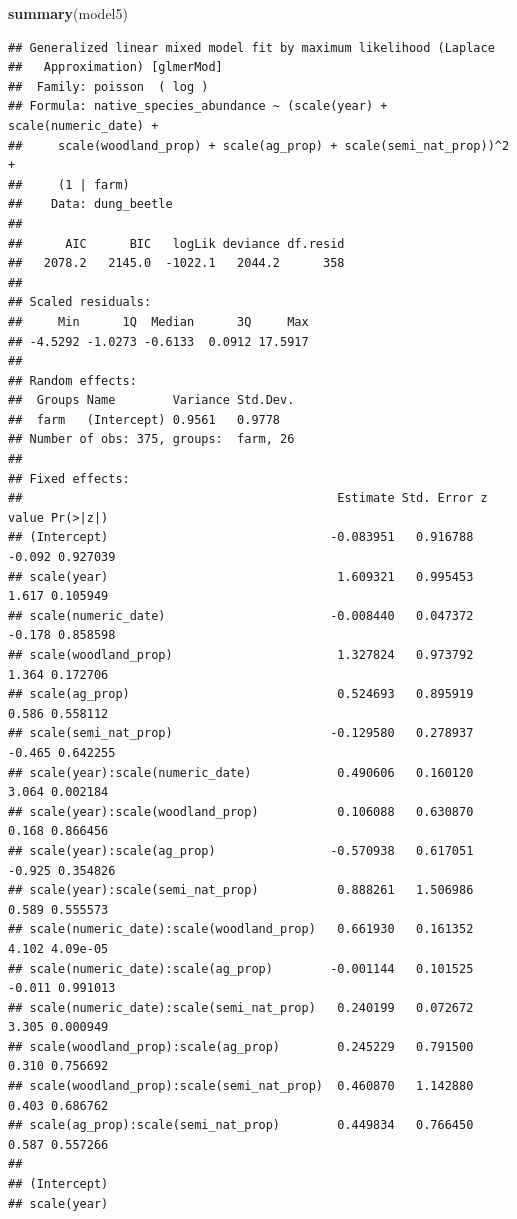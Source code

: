 \documentclass[
]{article}
\newenvironment{Shaded}{\begin{snugshade}}{\end{snugshade}}
\newcommand{\FunctionTok}[1]{\textcolor[rgb]{0.13,0.29,0.53}{\textbf{#1}}}
\newcommand{\NormalTok}[1]{#1}
\begin{document}
\begin{Shaded}
\begin{Highlighting}[]
\FunctionTok{summary}\NormalTok{(model5)}
\end{Highlighting}
\end{Shaded}

\begin{verbatim}
## Generalized linear mixed model fit by maximum likelihood (Laplace
##   Approximation) [glmerMod]
##  Family: poisson  ( log )
## Formula: native_species_abundance ~ (scale(year) + scale(numeric_date) +  
##     scale(woodland_prop) + scale(ag_prop) + scale(semi_nat_prop))^2 +  
##     (1 | farm)
##    Data: dung_beetle
## 
##      AIC      BIC   logLik deviance df.resid 
##   2078.2   2145.0  -1022.1   2044.2      358 
## 
## Scaled residuals: 
##     Min      1Q  Median      3Q     Max 
## -4.5292 -1.0273 -0.6133  0.0912 17.5917 
## 
## Random effects:
##  Groups Name        Variance Std.Dev.
##  farm   (Intercept) 0.9561   0.9778  
## Number of obs: 375, groups:  farm, 26
## 
## Fixed effects:
##                                            Estimate Std. Error z value Pr(>|z|)
## (Intercept)                               -0.083951   0.916788  -0.092 0.927039
## scale(year)                                1.609321   0.995453   1.617 0.105949
## scale(numeric_date)                       -0.008440   0.047372  -0.178 0.858598
## scale(woodland_prop)                       1.327824   0.973792   1.364 0.172706
## scale(ag_prop)                             0.524693   0.895919   0.586 0.558112
## scale(semi_nat_prop)                      -0.129580   0.278937  -0.465 0.642255
## scale(year):scale(numeric_date)            0.490606   0.160120   3.064 0.002184
## scale(year):scale(woodland_prop)           0.106088   0.630870   0.168 0.866456
## scale(year):scale(ag_prop)                -0.570938   0.617051  -0.925 0.354826
## scale(year):scale(semi_nat_prop)           0.888261   1.506986   0.589 0.555573
## scale(numeric_date):scale(woodland_prop)   0.661930   0.161352   4.102 4.09e-05
## scale(numeric_date):scale(ag_prop)        -0.001144   0.101525  -0.011 0.991013
## scale(numeric_date):scale(semi_nat_prop)   0.240199   0.072672   3.305 0.000949
## scale(woodland_prop):scale(ag_prop)        0.245229   0.791500   0.310 0.756692
## scale(woodland_prop):scale(semi_nat_prop)  0.460870   1.142880   0.403 0.686762
## scale(ag_prop):scale(semi_nat_prop)        0.449834   0.766450   0.587 0.557266
##                                              
## (Intercept)                                  
## scale(year)                                  

\end{verbatim}
\end{document}
